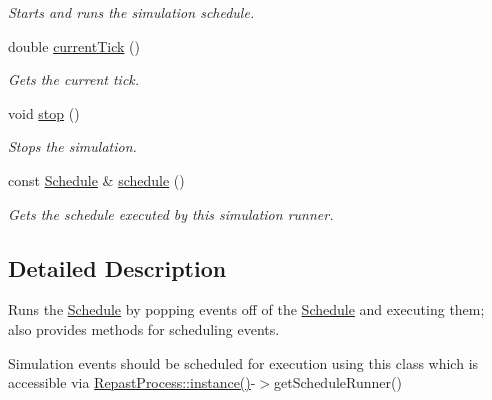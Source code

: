 \begin{DoxyCompactItemize}
\begin{DoxyCompactList}\small\item\em Starts and runs the simulation schedule. \end{DoxyCompactList}\item 
double \hyperlink{classrepast_1_1_schedule_runner_ab463376b173578b8e4e2f6f1ea378bcd}{current\-Tick} ()
\begin{DoxyCompactList}\small\item\em Gets the current tick. \end{DoxyCompactList}\item 
\hypertarget{classrepast_1_1_schedule_runner_a83c18e2030d72c7ae36ccf6a0723d9b8}{void \hyperlink{classrepast_1_1_schedule_runner_a83c18e2030d72c7ae36ccf6a0723d9b8}{stop} ()}\label{classrepast_1_1_schedule_runner_a83c18e2030d72c7ae36ccf6a0723d9b8}

\begin{DoxyCompactList}\small\item\em Stops the simulation. \end{DoxyCompactList}\item 
const \hyperlink{classrepast_1_1_schedule}{Schedule} \& \hyperlink{classrepast_1_1_schedule_runner_a18301612463546255bcd94513be5cc88}{schedule} ()
\begin{DoxyCompactList}\small\item\em Gets the schedule executed by this simulation runner. \end{DoxyCompactList}\end{DoxyCompactItemize}


\subsection{Detailed Description}
Runs the \hyperlink{classrepast_1_1_schedule}{Schedule} by popping events off of the \hyperlink{classrepast_1_1_schedule}{Schedule} and executing them; also provides methods for scheduling events. 

Simulation events should be scheduled for execution using this class which is accessible via \hyperlink{classrepast_1_1_repast_process_a8eed21e917ec5d66a11cde664938e92f}{Repast\-Process\-::instance()}-\/$>$get\-Schedule\-Runner() 

